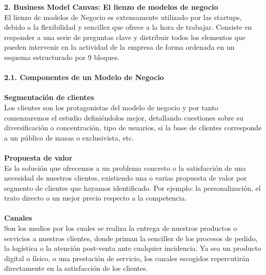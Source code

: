\documentclass[twoside,twocolumn]{article}
\begin{document}
\begin{flushright}
\begin{itemize}
\textbf{2.  Business Model Canvas: El lienzo de modelos de negocio}\\
El lienzo de modelos de Negocio es extensamente utilizado por las startups, debido a la flexibilidad y sencillez que ofrece a la hora de trabajar. Consiste en responder a una serie de preguntas clave y distribuir todos los elementos que pueden intervenir en la actividad de la empresa de forma ordenada en un esquema estructurado por 9 bloques.\\
\textbf{}\\
\textbf{2.1. Componentes de un Modelo de Negocio}\\
\textbf{}\\
\textbf{Segmentación de clientes}\\
Los clientes son los protagonistas del modelo de negocio y por tanto comenzaremos el estudio definiéndolos mejor, detallando cuestiones sobre su diversificación o concentración, tipo de usuarios, si la base de clientes corresponde a un público de masas o exclusivista, etc.
\textbf{}\\\textbf{}\\
\textbf{Propuesta de valor}\\
Es la solución que ofrecemos a un problema concreto o la satisfacción de una necesidad de nuestros clientes, existiendo una o varias propuesta de valor por segmento de clientes que hayamos identificado. Por ejemplo: la personalización, el trato directo o un mejor precio respecto a la competencia.
\textbf{}\\\textbf{}\\
\textbf{Canales}\\
Son los medios por los cuales se realiza la entrega de nuestros productos o servicios a nuestros clientes, donde priman la sencillez de los procesos de pedido, la logística o la atención post-venta ante cualquier incidencia. Ya sea un producto digital o físico, o una prestación de servicio, los canales escogidos repercutirán directamente en la satisfacción de los clientes.


\end{itemize}
\end{flushright}
\end{document}

